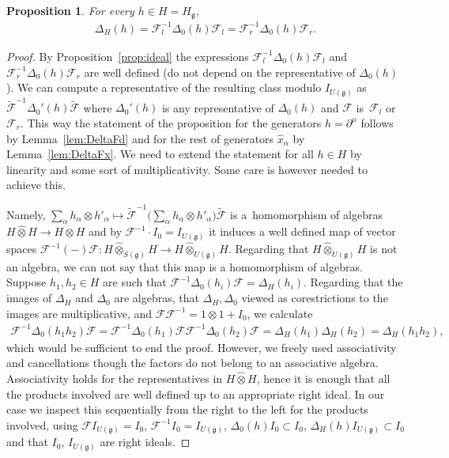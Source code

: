 \documentclass[pdftex]{sigma}
\def\gg{\mathfrak{g}}
\newtheorem{Proposition}[Theorem]{Proposition}
 { \theoremstyle{definition}
\newtheorem{Definition}[Theorem]{Definition}
\newtheorem{Example}[Theorem]{Example}
\newtheorem{Remark}[Theorem]{Remark} }
\numberwithin{equation}{section}
\begin{document}
\begin{Proposition}\label{prop:FDFm}
For every $h\in H = H_\gg$,
\begin{gather*}
\Delta_H(h) = \mathcal{F}_l^{-1}\Delta_0(h)\mathcal{F}_l = \mathcal{F}_r^{-1}\Delta_0(h)\mathcal{F}_r.
\end{gather*}
\end{Proposition}

\begin{proof} By Proposition~\ref{prop:ideal} the expressions $\mathcal{F}_l^{-1}\Delta_0(h)\mathcal{F}_l$ and $\mathcal{F}_r^{-1}\Delta_0(h)\mathcal{F}_r$ are well defined (do not depend on the representative of $\Delta_0(h)$). We can compute a representative of the resulting class modulo $I_{U(\gg)}$ as $\tilde{\mathcal{F}}^{-1}\Delta_0'(h)\tilde{\mathcal{F}}$ where $\Delta_0'(h)$ is any representative of $\Delta_0(h)$ and $\mathcal{F}$ is~$\mathcal{F}_l$ or~$\mathcal{F}_r$. This way the statement of the proposition for the generators $h = \partial^\mu$ follows by Lemma~\ref{lem:DeltaFd} and for the rest of generators $\hat{x}_\alpha$ by Lemma~\ref{lem:DeltaFx}. We need to extend the statement for all $h\in H$ by linearity and some sort of multiplicativity. Some care is however needed to achieve this.

Namely, $\sum_\alpha h_\alpha\otimes h'_\alpha \mapsto\tilde{\mathcal{F}}^{-1} \big(\sum_\alpha h_\alpha\otimes h'_\alpha\big) \tilde{\mathcal{F}}$ is a~homomorphism of algebras $H\hat\otimes H\to H\hat\otimes H$ and by $\mathcal{F}^{-1}\cdot I_0 = I_{U(\gg)}$ it induces a well defined map of vector spaces $\mathcal{F}^{-1} (-)\mathcal{F}\colon H\hat\otimes_{S(\gg)}H\to H\hat\otimes_{U(\gg)} H$. Regarding that $H\hat\otimes_{U(\gg)} H$ is not an algebra, we can not say that this map is a homomorphism of algebras. Suppose $h_1,h_2\in H$ are such that $\mathcal{F}^{-1}\Delta_0(h_i)\mathcal{F}=\Delta_H(h_i)$. Regarding that the images of $\Delta_H$ and $\Delta_0$ are algebras, that $\Delta_H, \Delta_0$ viewed as corestrictions to the images are multiplicative, and $\mathcal{F}\mathcal{F}^{-1} = 1\otimes 1 + I_0$, we calculate
\begin{gather*}\mathcal{F}^{-1}\Delta_0(h_1 h_2)\mathcal{F}=
\mathcal{F}^{-1}\Delta_0(h_1)\mathcal{F}\mathcal{F}^{-1}\Delta_0(h_2)\mathcal{F}=
\Delta_H(h_1)\Delta_H(h_2) = \Delta_H(h_1 h_2),\end{gather*}
which would be sufficient to end the proof. However, we freely used associativity and cancellations though the factors do not belong to an associative algebra. Associativity holds for the representatives in $H\hat\otimes H$, hence it is enough that all the products involved are well defined up to an appropriate right ideal. In our case we inspect this sequentially from the right to the left for the products involved, using $\mathcal{F} I_{U(\gg)} = I_0$, $\mathcal{F}^{-1} I_0 = I_{U(\gg)}$, $\Delta_0(h) I_0 \subset I_0$, $\Delta_H(h) I_{U(\gg)} \subset I_0$ and that $I_0$, $I_{U(\gg)}$ are right ideals.
\end{proof}
\end{document}
